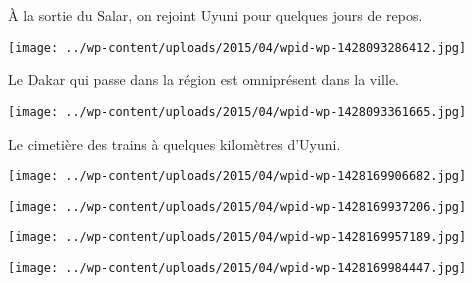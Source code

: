   \`A la sortie du Salar, on rejoint Uyuni pour quelques jours de repos. 
\begin{center} \texttt{[image: ../wp-content/uploads/2015/04/wpid-wp-1428093286412.jpg]} \end{center}
\vspace{-\topsep}

\pagebreak
 Le Dakar qui passe dans la région est omniprésent dans la ville. 
\begin{center} \texttt{[image: ../wp-content/uploads/2015/04/wpid-wp-1428093361665.jpg]} \end{center}

 Le cimetière des trains à quelques kilomètres d'Uyuni. 
\begin{center} \texttt{[image: ../wp-content/uploads/2015/04/wpid-wp-1428169906682.jpg]} \end{center}
\begin{center} \texttt{[image: ../wp-content/uploads/2015/04/wpid-wp-1428169937206.jpg]} \end{center}
\begin{center} \texttt{[image: ../wp-content/uploads/2015/04/wpid-wp-1428169957189.jpg]} \end{center}
\begin{center} \texttt{[image: ../wp-content/uploads/2015/04/wpid-wp-1428169984447.jpg]} \end{center}